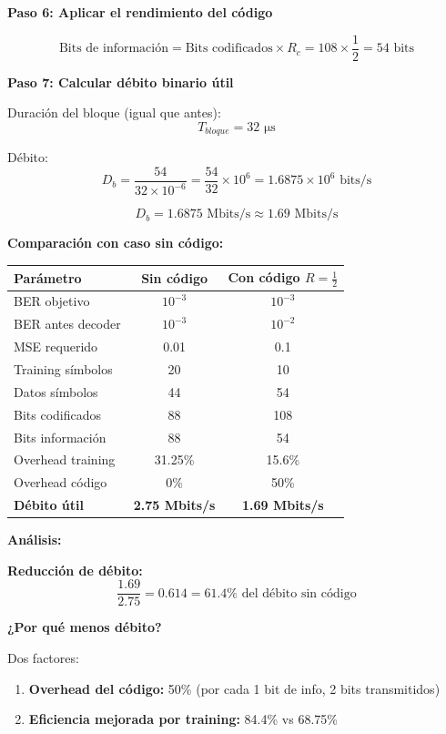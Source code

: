 \documentclass[11pt,a4paper]{article}
\begin{document}
\textbf{Paso 6: Aplicar el rendimiento del c\'odigo}

\[
\text{Bits de informaci\'on} = \text{Bits codificados} \times R_c = 108 \times \frac{1}{2} = 54 \text{ bits}
\]

\textbf{Paso 7: Calcular d\'ebito binario \'util}

Duraci\'on del bloque (igual que antes):
\[
T_{bloque} = 32 \text{ μs}
\]

D\'ebito:
\[
D_b = \frac{54}{32 \times 10^{-6}} = \frac{54}{32} \times 10^{6} = 1.6875 \times 10^{6} \text{ bits/s}
\]

\[
\boxed{D_b = 1.6875 \text{ Mbits/s} \approx 1.69 \text{ Mbits/s}}
\]

\textbf{Comparaci\'on con caso sin c\'odigo:}

\begin{center}
\begin{tabular}{|l|c|c|}
\hline
\textbf{Par\'ametro} & \textbf{Sin c\'odigo} & \textbf{Con c\'odigo $R=\frac{1}{2}$} \\
\hline
BER objetivo & $10^{-3}$ & $10^{-3}$ \\
BER antes decoder & $10^{-3}$ & $10^{-2}$ \\
MSE requerido & 0.01 & 0.1 \\
Training s\'imbolos & 20 & 10 \\
Datos s\'imbolos & 44 & 54 \\
Bits codificados & 88 & 108 \\
Bits informaci\'on & 88 & 54 \\
Overhead training & 31.25\% & 15.6\% \\
Overhead c\'odigo & 0\% & 50\% \\
\textbf{D\'ebito \'util} & \textbf{2.75 Mbits/s} & \textbf{1.69 Mbits/s} \\
\hline
\end{tabular}
\end{center}

\textbf{An\'alisis:}

\textbf{Reducci\'on de d\'ebito:}
\[
\frac{1.69}{2.75} = 0.614 = 61.4\% \text{ del d\'ebito sin c\'odigo}
\]

\textbf{¿Por qu\'e menos d\'ebito?}

Dos factores:
\begin{enumerate}
    \item \textbf{Overhead del c\'odigo:} 50\% (por cada 1 bit de info, 2 bits transmitidos)
    \item \textbf{Eficiencia mejorada por training:} 84.4\% vs 68.75\%
\end{enumerate}
\end{document}
